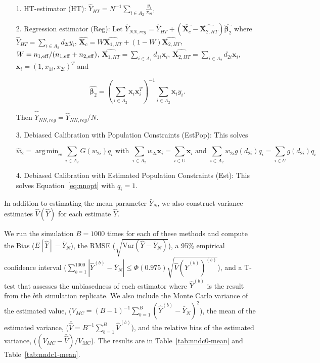 \documentclass[12pt]{article}
\DeclareMathOperator*{\argmin}{arg\,min}
\newcommand{\Var}{{\text{Var}}}
\renewcommand{\bf}[1]{\mathbf{#1}}
\begin{document}
\begin{itemize}
  \item[1.] HT-estimator (HT): $\hat Y_{HT} = N^{-1} \sum_{i \in A_2}
    \frac{y_i}{\pi_{2i}},$
  \item[2.] Regression estimator (Reg): Let $\hat Y_{NN, reg} = \hat Y_{HT} + (
    \hat{\bf X_c} - \hat{\bf X_{2, HT}}) \hat{\bm \beta_2}$ where $\hat Y_{HT} =
    \sum_{i \in A_2} d_{2i} y_i$, $\hat{\bf X_c} = W \hat{\bf X_{1, HT}} + (1 -
    W)\hat{\bf X_{2, HT}}$, $W = n_{1,\rm{eff}} / (n_{1,\rm{eff}} + n_{2, \rm{eff}})$,
    $\hat{\bf X_{1, HT}} = \sum_{i \in A_1} d_{1i} \bf x_{i}$, $\hat{\bf X_{2,
    HT}} = \sum_{i \in A_2} d_{2i} \bf x_{i}$, $\bf x_i = (1, x_{1i}, x_{2i})^T$
    and 

    $$ \hat{\bm \beta_2} = \left(\sum_{i \in A_2} \bf x_i \bf x_i^T\right)^{-1}
    \sum_{i \in A_2} \bf x_i y_i.$$

    Then $\hat{\bar Y}_{NN, reg} = \hat Y_{NN, reg} / N$.
  \item[3.] Debiased Calibration with Population Constraints (EstPop): This 
    solves 

  \begin{equation*}
  \hat w_2 = \argmin_w \sum_{i \in A_2} G(w_{2i}) q_i \text{ with } 
  \sum_{i \in A_2} w_{2i} \bf x_i = \sum_{i \in U} \bf x_i \text{ and } 
  \sum_{i \in A_2} w_{2i} g(d_{2i}) q_i = \sum_{i \in U} g(d_{2i}) q_i
  \end{equation*}

  \item[4.] Debiased Calibration with Estimated Population Constraints (Est):
    This solves Equation~\eqref{eq:nnopt} with $q_i = 1$.
\end{itemize}

In addition to estimating the mean parameter $\bar Y_N$, we also construct
variance estimates $\hat V(\hat Y)$ for each estimate $\hat Y$.

We run the simulation $B = 1000$ times for each of these methods and compute the
Bias ($E[\hat Y] - \bar Y_N$), the RMSE ($\sqrt{\Var(\hat Y - \bar Y_N)}$), a 95\%
empirical confidence interval ($\sum_{b = 1}^{1000} |\hat Y^{(b)} - \bar Y_N| \leq 
\Phi(0.975)\sqrt{\hat V(\hat Y^{(b)})^{(b)}}$), and a T-test that assesses the
unbiasedness of each estimator where $\hat Y^{(b)}$ is the result from the $b$th
simulation replicate. We also include the Monte Carlo variance of the estimated
value, ($V_{MC} = (B - 1)^{-1} \sum_{b = 1}^B (\hat Y^{(b)} - \bar Y_N)^2$), the
mean of the estimated variance, 
($\bar{\hat V} = B^{-1} \sum_{b = 1}^B \hat V^{(b)}$), and the relative bias of
the estimated variance, ($(V_{MC} - \bar{\hat V}) / V_{MC}$). The results are in
Table~\ref{tab:nndc0-mean} and Table~\ref{tab:nndc1-mean}.
\end{document}
